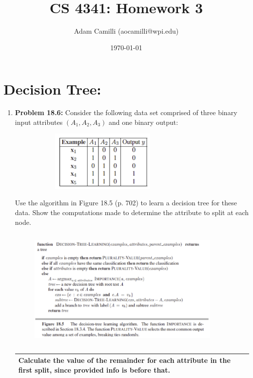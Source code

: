 \documentclass[10pt]{article}
\newenvironment{answer}
    {\begin{center}
    \begin{tabular}{|p{0.9\textwidth}|}
    \hline
    }
    { 
    \\\hline
    \end{tabular} 
    \end{center}
    }
\begin{document}
\title{CS 4341: Homework 3}
\author{Adam Camilli (aocamilli@wpi.edu)}
\date{\today}
\maketitle



\section*{Decision Tree:}
\begin{enumerate}
\item \textbf{Problem 18.6:} Consider the following data set comprised of three binary input attributes $(A_1,A_2,A_3)$ and one binary output:
  \begin{center}
  \begin{figure}[h!]
    \centering
    \includegraphics[width=0.7\textwidth,height=3cm,keepaspectratio]{hw3_3.png}
  \end{figure}
\end{center}
  Use the algorithm in Figure 18.5 (p. 702) to learn a decision tree for these data. Show the computations made to determine the attribute to split at each node.
  \begin{center}
  \begin{figure}[h!]
    \centering
    \includegraphics[width=0.9\textwidth,height=6cm,keepaspectratio]{hw3_4.png}
  \end{figure}
\end{center}
\begin{answer}
  Calculate the value of the remainder for each attribute in the first split, since provided info is before that.

\end{answer}
\end{enumerate}
\end{document}
